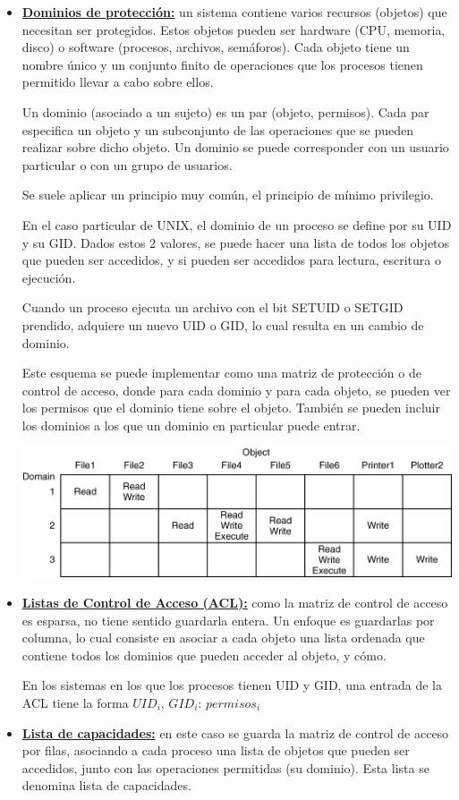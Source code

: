 \begin{itemize}
\item \textbf{\underline{Dominios de protección:}} un sistema contiene varios recursos (objetos) que necesitan ser protegidos. Estos objetos pueden ser hardware (CPU, memoria, disco) o software (procesos, archivos, semáforos). Cada objeto tiene un nombre único y un conjunto finito de operaciones que los procesos tienen permitido llevar a cabo sobre ellos.

Un dominio (asociado a un sujeto) es un par (objeto, permisos). Cada par especifica un objeto y un subconjunto de las operaciones que se pueden realizar sobre dicho objeto. Un dominio se puede corresponder con un usuario particular o con un grupo de usuarios.

Se suele aplicar un principio muy común, el principio de mínimo privilegio.

En el caso particular de UNIX, el dominio de un proceso se define por su UID y su GID. Dados estos 2 valores, se puede hacer una lista de todos los objetos que pueden ser accedidos, y si pueden ser accedidos para lectura, escritura o ejecución.

Cuando un proceso ejecuta un archivo con el bit SETUID o SETGID prendido, adquiere un nuevo UID o GID, lo cual resulta en un cambio de dominio.

Este esquema se puede implementar como una matriz de protección o de control de acceso, donde para cada dominio y para cada objeto, se pueden ver los permisos que el dominio tiene sobre el objeto. También se pueden incluir los dominios a los que un dominio en particular puede entrar.

\includegraphics[scale=1]{imagenes/protection-matrix}

\item \textbf{\underline{Listas de Control de Acceso (ACL):}} como la matriz de control de acceso es esparsa, no tiene sentido guardarla entera. Un enfoque es guardarlas por columna, lo cual consiste en asociar a cada objeto una lista ordenada que contiene todos los dominios que pueden acceder al objeto, y cómo.

En los sistemas en los que los procesos tienen UID y GID, una entrada de la ACL tiene la forma $UID_{i}$, $GID_{i}$: $permisos_{i}$

\item \textbf{\underline{Lista de capacidades:}} en este caso se guarda la matriz de control de acceso por filas, asociando a cada proceso una lista de objetos que pueden ser accedidos, junto con las operaciones permitidas (su dominio). Esta lista se denomina lista de capacidades.
\end{itemize}

